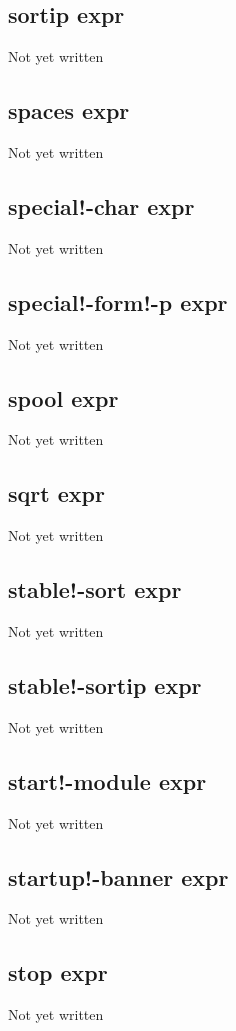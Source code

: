 \documentclass[a4paper,11pt]{article}
\begin{document}
{\subsection{\ttfamily sortip expr}
Not yet written

\subsection{\ttfamily spaces expr}
Not yet written

\subsection{\ttfamily special!-char expr}
Not yet written

\subsection{\ttfamily special!-form!-p expr}
Not yet written

\subsection{\ttfamily spool expr}
Not yet written

\subsection{\ttfamily sqrt expr}
Not yet written

\subsection{\ttfamily stable!-sort expr}
Not yet written

\subsection{\ttfamily stable!-sortip expr}
Not yet written

\subsection{\ttfamily start!-module expr}
Not yet written

\subsection{\ttfamily startup!-banner expr}
Not yet written

\subsection{\ttfamily stop expr}
Not yet written

}
\end{document}
